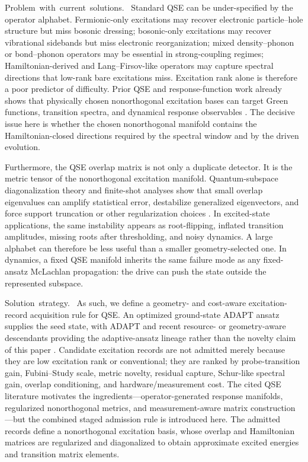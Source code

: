 \documentclass[
  reprint,
  amsmath,
  amssymb,
  aps,
  pra,
  nofootinbib,
  superscriptaddress,
  floatfix
]{revtex4-2}
\newcommand{\tentative}[1]{\textcolor{red!70!black}{#1}}
\newcommand{\structlabel}[1]{\noindent\mbox{\tentative{#1.}}~}
\begin{document}
\structlabel{Problem with current solutions}
Standard QSE can be under-specified by the operator alphabet.  Fermionic-only excitations may recover electronic particle--hole structure but miss bosonic dressing; bosonic-only excitations may recover vibrational sidebands but miss electronic reorganization; mixed density--phonon or bond--phonon operators may be essential in strong-coupling regimes; Hamiltonian-derived and Lang--Firsov-like operators may capture spectral directions that low-rank bare excitations miss.  Excitation rank alone is therefore a poor predictor of difficulty.  Prior QSE and response-function work already shows that physically chosen nonorthogonal excitation bases can target Green functions, transition spectra, and dynamical response observables \cite{Jamet2022GreenQSE,Dhawan2024ImagTimeGreen,Gauthier2024OccupationQSE,Kokcu2024LinearResponse,Umeano2025KitaevQSE}.  The decisive issue here is whether the chosen nonorthogonal manifold contains the Hamiltonian-closed directions required by the spectral window and by the driven evolution.

Furthermore, the QSE overlap matrix is not only a duplicate detector.  It is the metric tensor of the nonorthogonal excitation manifold.  Quantum-subspace diagonalization theory and finite-shot analyses show that small overlap eigenvalues can amplify statistical error, destabilize generalized eigenvectors, and force support truncation or other regularization choices \cite{Epperly2022QSD,Lee2024SamplingQKSD,Getelina2024HardwareNoiseQSE,OLeary2025PartitionedQSE,Kwao2026GEPQSE}.  In excited-state applications, the same instability appears as root-flipping, inflated transition amplitudes, missing roots after thresholding, and noisy dynamics.  A large alphabet can therefore be less useful than a smaller geometry-selected one.  In dynamics, a fixed QSE manifold inherits the same failure mode as any fixed-ansatz McLachlan propagation: the drive can push the state outside the represented subspace.

\structlabel{Solution strategy}
As such, we define a geometry- and cost-aware excitation-record acquisition rule for QSE.  An optimized ground-state ADAPT ansatz supplies the seed state, with ADAPT and recent resource- or geometry-aware descendants providing the adaptive-ansatz lineage rather than the novelty claim of this paper \cite{Grimsley2019ADAPT,Tang2021QubitADAPT,Anastasiou2024TETRIS,Ramoa2025CEO,Sohail2026GeoADAPT}.  Candidate excitation records are not admitted merely because they are low excitation rank or conventional; they are ranked by probe-transition gain, Fubini--Study scale, metric novelty, residual capture, Schur-like spectral gain, overlap conditioning, and hardware/measurement cost.  The cited QSE literature motivates the ingredients---operator-generated response manifolds, regularized nonorthogonal metrics, and measurement-aware matrix construction---but the combined staged admission rule is introduced here.  The admitted records define a nonorthogonal excitation basis, whose overlap and Hamiltonian matrices are regularized and diagonalized to obtain approximate excited energies and transition matrix elements.
\end{document}
